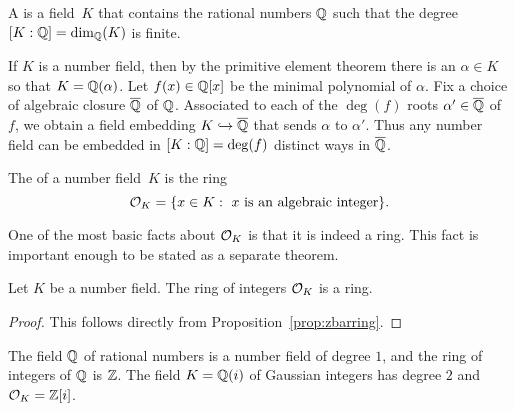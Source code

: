 \begin{definition}
  A  is a field~$K$ that contains the rational
  numbers $\mathbb{Q}$ such that the degree $[K:\mathbb{Q}] = \dim_{\mathbb{Q}}(K)$ is finite.
\end{definition}

If $K$ is a number field, then by the primitive element theorem there
is an $\alpha \in K$ so that $K = \mathbb{Q}(\alpha)$.  Let $f(x) \in \mathbb{Q}[x]$
be the minimal polynomial of $\alpha$.  Fix a choice of algebraic
closure $\overline{\mathbb{Q}}$ of $\mathbb{Q}$.  Associated to each of the $\deg(f)$ roots
$\alpha'\in\overline{\mathbb{Q}}$ of $f$, we obtain a field embedding $K \hookrightarrow \overline{\mathbb{Q}}$
that sends $\alpha$ to $\alpha'$.  Thus any number field can be
embedded in $[K:\mathbb{Q}]=\deg(f)$ distinct ways in $\overline{\mathbb{Q}}$.

\begin{definition}
  The  of a number field~$K$ is the ring
  \[
    \mathcal{O}_K = \{x \in K : \text{ $x$ is an algebraic integer}\}.
  \]
\end{definition}

One of the most basic facts about $\mathcal{O}_K$ is that it is indeed a ring.
This fact is important enough to be stated as a separate theorem.

\begin{theorem}
  Let $K$ be a number field.
  The ring of integers $\mathcal{O}_K$ is a ring.
\end{theorem}
\begin{proof}
  This follows directly from Proposition~\ref{prop:zbarring}.
\end{proof}


\begin{example}
  The field $\mathbb{Q}$ of rational numbers is a number field of degree $1$,
  and the ring of integers of $\mathbb{Q}$ is $\mathbb{Z}$.  The field $K=\mathbb{Q}(i)$ of
  Gaussian integers has degree $2$ and $\mathcal{O}_K = \mathbb{Z}[i]$.
\end{example}

